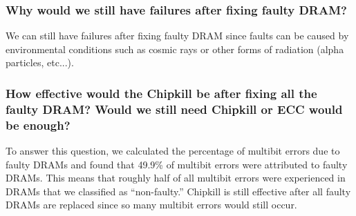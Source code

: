 \subsubsection{Why would we still have failures after fixing faulty DRAM?}
We can still have failures after fixing faulty DRAM since faults can be caused
by environmental conditions such as cosmic rays or other forms of radiation
(alpha particles, etc...).

\subsubsection{How effective would the Chipkill be after fixing all the faulty
DRAM? Would we still need Chipkill or ECC would be enough?}
To answer this question, we calculated the percentage of multibit errors due to
faulty DRAMs and found that 49.9\% of multibit errors were attributed to faulty
DRAMs.  This means that roughly half of all multibit errors were experienced in
DRAMs that we classified as ``non-faulty.''  Chipkill is still effective after
all faulty DRAMs are replaced since so many multibit errors would still occur.
